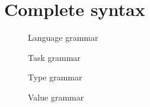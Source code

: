
\section{Complete syntax}

\begin{figure}
  \small
  \caption{Language grammar} \label{fig:language-grammar}
\end{figure}

\begin{figure}
  \small
  \caption{Task grammar} \label{fig:task-grammar}
\end{figure}


\begin{figure}
  \small
  \caption{Type grammar} \label{fig:type-grammar}
\end{figure}

\begin{figure}
  \small
  \caption{Value grammar} \label{fig:value-grammar}
\end{figure}
